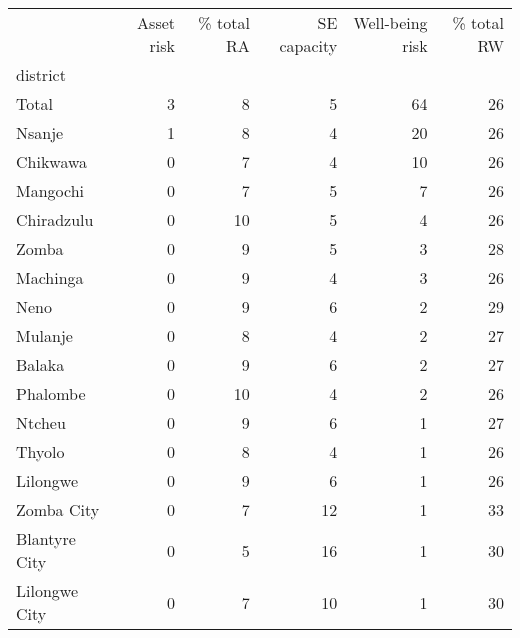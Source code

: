 \begin{tabular}{lrrrrr}
\toprule
{} &  Asset risk &  \% total RA &  SE capacity &  Well-being risk &  \% total RW \\
district      &             &             &              &                  &             \\
\midrule
Total         &           3 &           8 &            5 &               64 &          26 \\
Nsanje        &           1 &           8 &            4 &               20 &          26 \\
Chikwawa      &           0 &           7 &            4 &               10 &          26 \\
Mangochi      &           0 &           7 &            5 &                7 &          26 \\
Chiradzulu    &           0 &          10 &            5 &                4 &          26 \\
Zomba         &           0 &           9 &            5 &                3 &          28 \\
Machinga      &           0 &           9 &            4 &                3 &          26 \\
Neno          &           0 &           9 &            6 &                2 &          29 \\
Mulanje       &           0 &           8 &            4 &                2 &          27 \\
Balaka        &           0 &           9 &            6 &                2 &          27 \\
Phalombe      &           0 &          10 &            4 &                2 &          26 \\
Ntcheu        &           0 &           9 &            6 &                1 &          27 \\
Thyolo        &           0 &           8 &            4 &                1 &          26 \\
Lilongwe      &           0 &           9 &            6 &                1 &          26 \\
Zomba City    &           0 &           7 &           12 &                1 &          33 \\
Blantyre City &           0 &           5 &           16 &                1 &          30 \\
Lilongwe City &           0 &           7 &           10 &                1 &          30 \\

\end{tabular}
